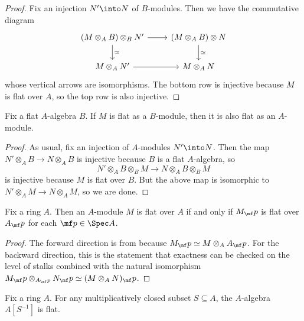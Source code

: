 \documentclass[../notes.tex]{subfiles}
\begin{document}
\begin{proof}
	Fix an injection $N'\into N$ of $B$-modules. Then we have the commutative diagram
	\[\begin{tikzcd}
		{(M\otimes_AB)\otimes_B N'} & {(M\otimes_AB)\otimes N} \\
		{M\otimes_A N'} & {M\otimes_AN}
		\arrow[from=1-1, to=1-2]
		\arrow[from=2-1, to=2-2]
		\arrow["\simeq", from=1-1, to=2-1]
		\arrow["\simeq", from=1-2, to=2-2]
	\end{tikzcd}\]
	whose vertical arrows are isomorphisms. The bottom row is injective because $M$ is flat over $A$, so the top row is also injective.
\end{proof}
\begin{lemma}[Transitivity] \label{lem:flat-trans}
	Fix a flat $A$-algebra $B$. If $M$ is flat as a $B$-module, then it is also flat as an $A$-module.
\end{lemma}
\begin{proof}
	As usual, fix an injection of $A$-modules $N'\into N$. Then the map $N'\otimes_AB\to N\otimes_AB$ is injective because $B$ is a flat $A$-algebra, so
	\[N'\otimes_AB\otimes_BM\to N\otimes_AB\otimes_BM\]
	is injective because $M$ is flat over $B$. But the above map is isomorphic to $N'\otimes_AM\to N\otimes_AM$, so we are done.
\end{proof}
\begin{lemma} \label{lem:flat-is-local}
	Fix a ring $A$. Then an $A$-module $M$ is flat over $A$ if and only if $M_\mf p$ is flat over $A_\mf p$ for each $\mf p\in\Spec A$.
\end{lemma}
\begin{proof}
	The forward direction is from  because $M_\mf p\simeq M\otimes_AA_\mf p$. For the backward direction, this is the statement that exactness can be checked on the level of stalks combined with the natural isomorphism $M_\mf p\otimes_{A_\mf p}N_\mf p\simeq(M\otimes_AN)_\mf p$.
\end{proof}
\begin{lemma}
	Fix a ring $A$. For any multiplicatively closed subset $S\subseteq A$, the $A$-algebra $A\left[S^{-1}\right]$ is flat.
\end{lemma}
\end{document}
